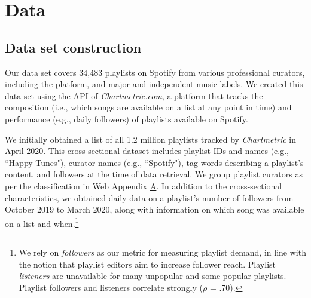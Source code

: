 \section{Data} 
\label{sec:data}

\subsection{Data set construction}

Our data set covers 34,483 playlists on Spotify from various professional curators, including the platform, and major and independent music labels. We created this data set using the API of \textit{Chartmetric.com}, a platform that tracks the composition (i.e., which songs are available on a list at any point in time) and performance (e.g., daily followers) of playlists available on Spotify. 

We initially obtained a list of all 1.2 million playlists tracked by \textit{Chartmetric} in April 2020. This cross-sectional dataset includes playlist IDs and names (e.g., ``Happy Tunes"), curator names (e.g., ``Spotify"), tag words describing a playlist's content, and followers at the time of data retrieval. We group playlist curators as per the classification in Web Appendix \hyperref[curators]{A}.
In addition to the cross-sectional characteristics, we obtained daily data on a playlist's number of followers from October 2019 to March 2020, along with information on which song was available on a list and when.\footnote{We rely on \textit{followers} as our metric for measuring playlist  demand, in line with the notion that playlist editors aim to increase follower reach. Playlist \textit{listeners} are unavailable for many unpopular and some popular playlists. Playlist followers and listeners correlate strongly ($\rho$ = .70).} %

